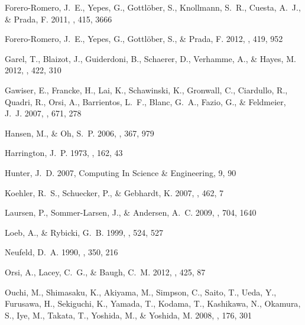 \documentclass{emulateapj}
\begin{document}
\begin{thebibliography}{38}
{Forero-Romero}, J.~E., {Yepes}, G., {Gottl{\"o}ber}, S., {Knollmann}, S.~R.,
  {Cuesta}, A.~J., \& {Prada}, F. 2011, \mnras, 415, 3666

{Forero-Romero}, J.~E., {Yepes}, G., {Gottl{\"o}ber}, S., \& {Prada}, F. 2012,
  \mnras, 419, 952

{Garel}, T., {Blaizot}, J., {Guiderdoni}, B., {Schaerer}, D., {Verhamme}, A.,
  \& {Hayes}, M. 2012, \mnras, 422, 310

{Gawiser}, E., {Francke}, H., {Lai}, K., {Schawinski}, K., {Gronwall}, C.,
  {Ciardullo}, R., {Quadri}, R., {Orsi}, A., {Barrientos}, L.~F., {Blanc},
  G.~A., {Fazio}, G., \& {Feldmeier}, J.~J. 2007, \apj, 671, 278

{Hansen}, M., \& {Oh}, S.~P. 2006, \mnras, 367, 979

{Harrington}, J.~P. 1973, \mnras, 162, 43

Hunter, J.~D. 2007, Computing In Science \& Engineering, 9, 90

{Koehler}, R.~S., {Schuecker}, P., \& {Gebhardt}, K. 2007, \aap, 462, 7

{Laursen}, P., {Sommer-Larsen}, J., \& {Andersen}, A.~C. 2009, \apj, 704, 1640

{Loeb}, A., \& {Rybicki}, G.~B. 1999, \apj, 524, 527

{Neufeld}, D.~A. 1990, \apj, 350, 216

{Orsi}, A., {Lacey}, C.~G., \& {Baugh}, C.~M. 2012, \mnras, 425, 87

{Ouchi}, M., {Shimasaku}, K., {Akiyama}, M., {Simpson}, C., {Saito}, T.,
  {Ueda}, Y., {Furusawa}, H., {Sekiguchi}, K., {Yamada}, T., {Kodama}, T.,
  {Kashikawa}, N., {Okamura}, S., {Iye}, M., {Takata}, T., {Yoshida}, M., \&
  {Yoshida}, M. 2008, \apjs, 176, 301


\end{thebibliography}
\end{document}
